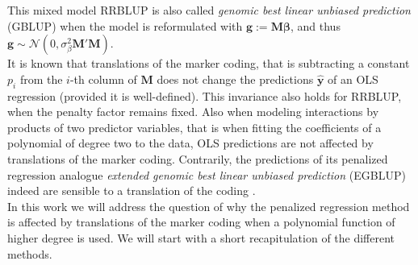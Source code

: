 \documentclass{bmcart}
\newcommand{\M}{\mathbf{M}}
\newcommand{\0}{\mathbf{0}}
\newcommand{\y}{\mathbf{y}}
\begin{document}
This mixed model RRBLUP is also called \emph{genomic best linear unbiased prediction} (GBLUP) when the model is reformulated with $\mathbf{g}:=\M \bm{\beta}$, and thus $\mathbf{g}\sim \mathcal{N}(0,\sigma_\beta^2 \M' \M)$. \\

It is known that translations of the marker coding, that is subtracting a constant $p_i$ from the $i$-th column of $\M$ does not change the predictions $\hat{\y}$ of an  OLS regression (provided it is well-defined). This invariance also holds for RRBLUP, when the penalty factor remains fixed. Also when modeling interactions by products of two predictor variables, that is when fitting the coefficients of a polynomial of degree two to the data, OLS predictions are not affected by translations of the marker coding. Contrarily, the predictions of its penalized regression analogue \emph{extended genomic best linear unbiased prediction} (EGBLUP) indeed are sensible to a translation of the coding \cite{he2016does,Martini17}.\\

In this work we will address the question of why the penalized regression method is affected by translations of the marker coding when a polynomial function of higher degree is used. 
We will start with a short recapitulation of the different methods.
\end{document}
